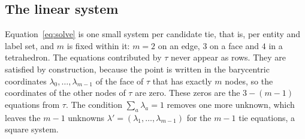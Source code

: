\documentclass[11pt]{article}
\theoremstyle{definition}
\newcommand{\tet}{\tau}
\begin{document}
\subsection{The linear system}

Equation~\eqref{eq:solve} is one small system per candidate tie, that is, per
entity and label set, and $m$ is fixed within it: $m=2$ on an edge, $3$ on a
face and $4$ in a tetrahedron. The equations contributed by $\tet$ never
appear as rows. They are satisfied by construction, because the point is
written in the barycentric coordinates $\lambda_0,\dots,\lambda_{m-1}$ of the
face of $\tet$ that has exactly $m$ nodes, so the coordinates of the other
nodes of $\tet$ are zero. These zeros are the $3-(m-1)$ equations from $\tet$.
The condition $\sum_a \lambda_a = 1$ removes one more unknown, which leaves the
$m-1$ unknowns $\lambda' = (\lambda_1,\dots,\lambda_{m-1})$ for the $m-1$ tie
equations, a square system.
\end{document}
